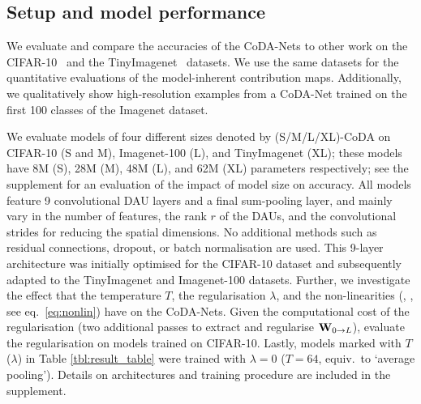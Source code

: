 \subsection{Setup and model performance}
\label{subsec:accuracy}

 We evaluate and compare the accuracies of the CoDA-Nets to other work on the CIFAR-10~\cite{krizhevsky2009cifar10} and the TinyImagenet~\cite{tinyimagenet} datasets. We use the same datasets for the quantitative evaluations of the model-inherent contribution maps. Additionally, we qualitatively show high-resolution examples from a CoDA-Net trained on the first 100 classes of the Imagenet dataset. 

We evaluate models of four different sizes
denoted by (S/M/L/XL)-CoDA on CIFAR-10 (S and M), Imagenet-100 (L), and TinyImagenet (XL); these models have 8M (S), 28M (M), 48M (L), and 62M (XL) parameters respectively; see the supplement for an evaluation of the impact of model size on accuracy.
All models feature 9 convolutional DAU layers and a final sum-pooling layer, and mainly vary in the number of features, the rank $r$ of the DAUs,  and the convolutional strides for reducing the spatial dimensions. 
No additional methods such as residual connections, dropout, or batch normalisation are used. This 9-layer architecture was initially optimised for the CIFAR-10 dataset and subsequently adapted to the TinyImagenet and Imagenet-100 datasets. 
Further, we investigate the effect that the temperature $T$, the regularisation $\lambda$, and the non-linearities (, , see eq.~\eqref{eq:nonlin}) have on the CoDA-Nets. Given the computational cost of the regularisation (two additional passes to extract and regularise $\mat w_{0\rightarrow L}$), evaluate the regularisation on models trained on CIFAR-10. Lastly, models marked with $T$ ($\lambda$) in Table \ref{tbl:result_table} were trained with $\lambda$$=$$0$ ($T$$=$$64$, equiv.~to `average pooling'). Details on architectures and training procedure are included in the supplement.

